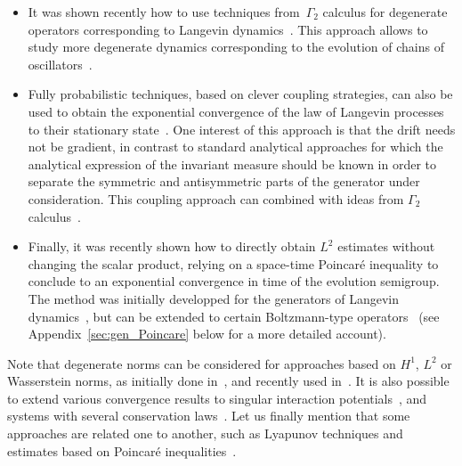 \documentclass[10pt]{amsart}
\theoremstyle{definition}\newtheorem{defi}[theo]{Definition}\newtheorem{rema}[theo]{Remark}\newtheorem{exam}[theo]{Example}\newtheorem{exem}[theo]{Example}\newtheorem{nota}[theo]{Notation}
\begin{document}
\begin{itemize}
\item It was shown recently how to use techniques from~$\Gamma_2$ calculus for degenerate operators corresponding to Langevin dynamics~\cite{Baudoin17, Mon19a}. This approach allows to study more degenerate dynamics corresponding to the evolution of chains of oscillators~\cite{Menegaki19}.

\item Fully probabilistic techniques, based on clever coupling strategies, can also be used to obtain the exponential convergence of the law of Langevin processes to their stationary state~\cite{EGZ19}. One interest of this approach is that the drift needs not be gradient, in contrast to standard analytical approaches for which the analytical expression of the invariant measure should be known in order to separate the symmetric and antisymmetric parts of the generator under consideration. This coupling approach can combined with ideas from $\Gamma_2$ calculus~\cite{CG14}.

\item Finally, it was recently shown how to directly obtain $L^2$ estimates without changing the scalar product, relying on a space-time Poincaré inequality to conclude to an exponential convergence in time of the evolution semigroup. The method was initially developped for the generators of Langevin dynamics~\cite{AM19,CLW19}, but can be extended to certain Boltzmann-type operators~\cite{LW20} (see Appendix~\ref{sec:gen_Poincare} below for a more detailed account).
\end{itemize}
Note that degenerate norms can be considered for approaches based on $H^1$, $L^2$ or Wasserstein norms, as initially done in~\cite{Talay02}, and recently used in~\cite{Baudoin17,OL15,IOS19}. It is also possible to extend various convergence results to singular interaction potentials~\cite{BGH19,CHSG21,Herzog18,HM19}, and systems with several conservation laws~\cite{CDHMMS21}. Let us finally mention that some approaches are related one to another, such as Lyapunov techniques and estimates based on Poincaré inequalities~\cite{BCG08}.
\vspace{30pt}
\end{document}
